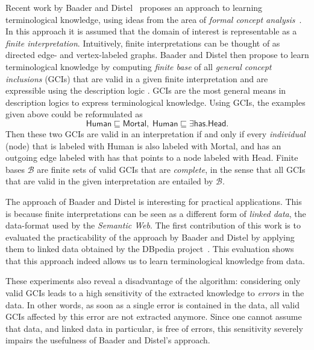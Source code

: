 \documentclass[english,fleqn]{scrartcl}
\begin{document}
Recent work by Baader and Distel~\cite{Diss-Felix} proposes an approach to learning
terminological knowledge, using ideas from the area of \emph{formal concept
  analysis}~\cite{fca-book}.  In this approach it is assumed that the domain of interest
is representable as a \emph{finite interpretation}.  Intuitively, finite interpretations
can be thought of as directed edge- and vertex-labeled graphs.  Baader and Distel then
propose to learn terminological knowledge by computing \emph{finite base} of all
\emph{general concept inclusions} (GCIs) that are valid in a given finite interpretation
and are expressible using the description logic \ELbot.  GCIs are the most general means
in description logics to express terminological knowledge.  Using GCIs, the examples given
above could be reformulated as
\begin{equation*}
  \mathsf{Human} \sqsubseteq \mathsf{Mortal}, \; \mathsf{Human} \sqsubseteq \exists
  \mathsf{has}. \mathsf{Head}.
\end{equation*}
Then these two GCIs are valid in an interpretation if and only if every \emph{individual}
(node) that is labeled with \textsf{Human} is also labeled with \textsf{Mortal}, and has
an outgoing edge labeled with \textsf{has} that points to a node labeled with
\textsf{Head}.  Finite bases $\mathcal{B}$ are finite sets of valid GCIs that are
\emph{complete}, in the sense that all GCIs that are valid in the given interpretation are
entailed by $\mathcal{B}$.

The approach of Baader and Distel is interesting for practical applications.  This is
because finite interpretations can be seen as a different form of \emph{linked data}, the
data-format used by the \emph{Semantic Web}.  The first contribution of this work is to
evaluated the practicability of the approach by Baader and Distel by applying them to
linked data obtained by the DBpedia project~\cite{DBpedia}.  This evaluation shows that
this approach indeed allows us to learn terminological knowledge from data.

These experiments also reveal a disadvantage of the algorithm: considering only valid GCIs
leads to a high sensitivity of the extracted knowledge to \emph{errors} in the data.  In
other words, as soon as a single error is contained in the data, all valid GCIs affected
by this error are not extracted anymore.  Since one cannot assume that data, and linked
data in particular, is free of errors, this sensitivity severely impairs the usefulness of
Baader and Distel's approach.
\end{document}
